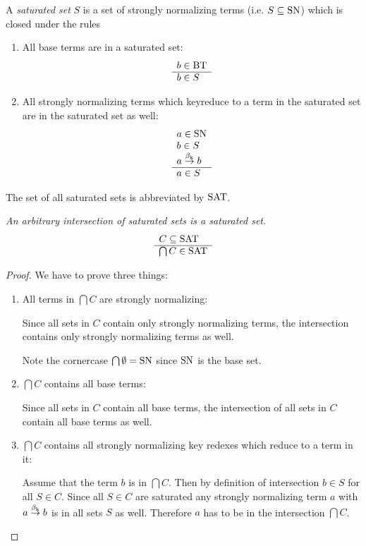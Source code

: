 \begin{definition}
    A \emph{saturated set} $S$ is a set of strongly normalizing terms (i.e. $S
    \subseteq \text{SN}$) which is closed under the rules
    \begin{enumerate}
    \item All base terms are in a saturated set:
        $$ \begin{array}{l} b \in \text{BT} \\ \hline b \in S\end{array}$$

    \item All strongly normalizing terms which keyreduce to a term in the
        saturated set are in the saturated set as well:
            $$
            \begin{array}{l} 
                a \in \text{SN}
                \\
                b \in S
                \\
                a \stackrel{\beta_{\text{k}}}{\to} b
             \\ \hline 
                a \in S
            \end{array}
            $$
    \end{enumerate}
    The set of all saturated sets is abbreviated by $\text{SAT}$.
\end{definition}



\begin{theorem}
    \label{SaturatedSetsIntersection}
    \emph{An arbitrary intersection of saturated sets is a saturated set}.
    $$
    \begin{array}{l} 
        C \subseteq \text{SAT}
     \\ \hline 
        \bigcap C \in \text{SAT}
    \end{array}
    $$
    \begin{proof}
        We have to prove three things:
        \begin{enumerate}
        \item All terms in $\bigcap C$ are strongly normalizing:

            Since all sets in $C$ contain only strongly normalizing
            terms, the intersection contains only strongly normalizing terms
            as well.

            Note the cornercase $\bigcap \emptyset = \text{SN}$ since $\text{SN}$ is the
                base set.

        \item $\bigcap C$ contains all base terms:

            Since all sets in $C$ contain all base terms, the intersection of
            all sets in $C$ contain all base terms as well.

        \item $\bigcap C$ contains all strongly normalizing key redexes which
            reduce to a term in it:

            Assume that the term $b$ is in $\bigcap C$. Then by definition of
                intersection $b \in S$ for all $S \in C$. Since all $S \in C$
                are saturated any strongly normalizing term $a$ with $a
                \stackrel{\beta_{\text{k}}}{\to} b$ is in all sets $S$ as well. Therefore $a$ has to
                be in the intersection $\bigcap C$.
        \end{enumerate}
    \end{proof}
\end{theorem}


